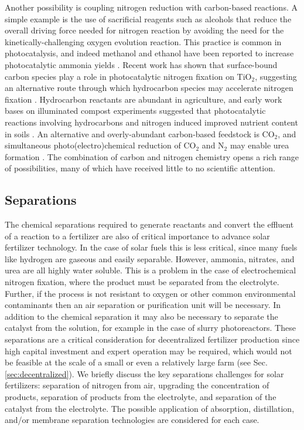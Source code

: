 Another possibility is coupling nitrogen reduction with carbon-based reactions. A simple example is the use of sacrificial reagents such as alcohols that reduce the overall driving force needed for nitrogen reaction by avoiding the need for the kinetically-challenging oxygen evolution reaction. This practice is common in photocatalysis, and indeed methanol and ethanol have been reported to increase photocatalytic ammonia yields \cite{Ullmann_amm_2006}. Recent work has shown that surface-bound carbon species play a role in photocatalytic nitrogen fixation on TiO$_2$, suggesting an alternative route through which hydrocarbon species may accelerate nitrogen fixation \cite{Comer_JACS}. Hydrocarbon reactants are abundant in agriculture, and early work bases on illuminated compost experiments suggested that photocatalytic reactions involving hydrocarbons and nitrogen induced improved nutrient content in soils \cite{Dhar_1941}. An alternative and overly-abundant carbon-based feedstock is CO$_2$, and simultaneous photo(electro)chemical reduction of CO$_2$ and N$_2$ may enable urea formation \cite{Srinivas_2011}. 
The combination of carbon and nitrogen chemistry opens a rich range of possibilities, many of which have received little to no scientific attention. 

\subsection{Separations}
\label{sec:separation}

The chemical separations required to generate reactants and convert the effluent of a reaction to a fertilizer are also of critical importance to advance solar fertilizer technology. In the case of solar fuels this is less critical, since many fuels like hydrogen are gaseous and easily separable. However, ammonia, nitrates, and urea are all highly water soluble. This is a problem in the case of electrochemical nitrogen fixation, where the product must be separated from the electrolyte. Further, if the process is not resistant to oxygen or other common environmental contaminants then an air separation or purification unit will be necessary. In addition to the chemical separation it may also be necessary to separate the catalyst from the solution, for example in the case of slurry photoreactors. These separations are a critical consideration for decentralized fertilizer production since high capital investment and expert operation may be required, which would not be feasible at the scale of a small or even a relatively large farm (see Sec. \ref{sec:decentralized}). We briefly discuss the key separations challenges for solar fertilizers: separation of nitrogen from air, upgrading the concentration of products, separation of products from the electrolyte, and separation of the catalyst from the electrolyte. The possible application of absorption, distillation, and/or membrane separation technologies are considered for each case.

